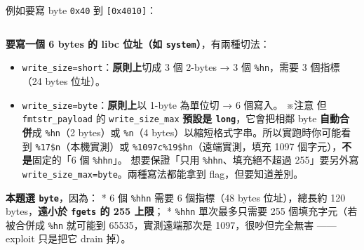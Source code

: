 \documentclass[10pt,a4paper]{article}
\providecommand{\tightlist}{%
  \setlength{\itemsep}{0pt}\setlength{\parskip}{0pt}}
\begin{document}
例如要寫 byte \texttt{0x40} 到 \texttt{{[}0x4010{]}}：

\begin{Verbatim}[breaklines=true,breakanywhere=true,breakautoindent=false,fontsize=\fontsize{7.0}{9.5}\selectfont]
%64c%17$hhn     ← 先印 64 個字元（計數 = 64 = 0x40），再寫進第 17 個參數指向的位址
\end{Verbatim}

\textbf{要寫一個 6 bytes 的 libc 位址（如
\texttt{system}）}，有兩種切法：

\begin{itemize}
\tightlist
\item
  \texttt{write\_\allowbreak{}size=\textquotesingle{}\allowbreak{}short\textquotesingle{}\allowbreak{}}：\textbf{原則上}切成
  3 個 2-bytes → 3 個 \texttt{\%\allowbreak{}hn}，需要 3 個指標（24 bytes 位址）。
\item
  \texttt{write\_\allowbreak{}size=\textquotesingle{}\allowbreak{}byte\textquotesingle{}\allowbreak{}}：\textbf{原則上}以
  1-byte 為單位切 → 6 個寫入。 ※注意 但 \texttt{fmtstr\_\allowbreak{}payload} 的
  \texttt{write\_\allowbreak{}size\_\allowbreak{}max} \textbf{預設是
  \texttt{\textquotesingle{}\allowbreak{}long\textquotesingle{}\allowbreak{}}}，它會把相鄰 byte
  \textbf{自動合併}成 \texttt{\%\allowbreak{}hn}（2 bytes）或 \texttt{\%\allowbreak{}n}（4
  bytes）以縮短格式字串。所以實跑時你可能看到
  \texttt{\%\allowbreak{}17\$\allowbreak{}n}（本機實測）或
  \texttt{\%\allowbreak{}1097c\%\allowbreak{}19\$\allowbreak{}hn}（遠端實測，填充 1097
  個字元），\textbf{不是}固定的「6 個 \texttt{\%\allowbreak{}hhn}」。 想要保證「只用
  \texttt{\%\allowbreak{}hhn}、填充絕不超過 255」要另外寫
  \texttt{write\_\allowbreak{}size\_\allowbreak{}max=\textquotesingle{}\allowbreak{}byte\textquotesingle{}\allowbreak{}}。兩種寫法都能拿到
  flag，但要知道差別。
\end{itemize}

\textbf{本題選 \texttt{byte}}，因為： * 6 個 \texttt{\%\allowbreak{}hhn} 需要 6
個指標（48 bytes 位址），總長約 120 bytes，\textbf{遠小於 \texttt{fgets}
的 255 上限}； * \texttt{\%\allowbreak{}hhn} 單次最多只需要 255
個填充字元（若被合併成 \texttt{\%\allowbreak{}hn} 就可能到 65535，實測遠端那次是
1097，很吵但完全無害 ------ exploit 只是把它 drain 掉）。
\end{document}
